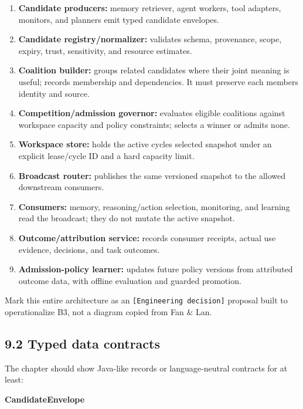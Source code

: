 \begin{enumerate}
\def\labelenumi{\arabic{enumi}.}
\tightlist
\item
  \textbf{Candidate producers:} memory retriever, agent workers, tool adapters, monitors, and planners emit typed candidate envelopes.
\item
  \textbf{Candidate registry/normalizer:} validates schema, provenance, scope, expiry, trust, sensitivity, and resource estimates.
\item
  \textbf{Coalition builder:} groups related candidates where their joint meaning is useful; records membership and dependencies. It must preserve each member\textquotesingle s identity and source.
\item
  \textbf{Competition/admission governor:} evaluates eligible coalitions against workspace capacity and policy constraints; selects a winner or admits none.
\item
  \textbf{Workspace store:} holds the active cycle\textquotesingle s selected snapshot under an explicit lease/cycle ID and a hard capacity limit.
\item
  \textbf{Broadcast router:} publishes the same versioned snapshot to the allowed downstream consumers.
\item
  \textbf{Consumers:} memory, reasoning/action selection, monitoring, and learning read the broadcast; they do not mutate the active snapshot.
\item
  \textbf{Outcome/attribution service:} records consumer receipts, actual use evidence, decisions, and task outcomes.
\item
  \textbf{Admission-policy learner:} updates future policy versions from attributed outcome data, with offline evaluation and guarded promotion.
\end{enumerate}

Mark this entire architecture as an \texttt{{[}Engineering\ decision{]}} proposal built to operationalize B3, not a diagram copied from Fan \& Lan.

\subsection{9.2 Typed data contracts}\label{92-typed-data-contracts}

The chapter should show Java-like records or language-neutral contracts for at least:

\textbf{CandidateEnvelope}

